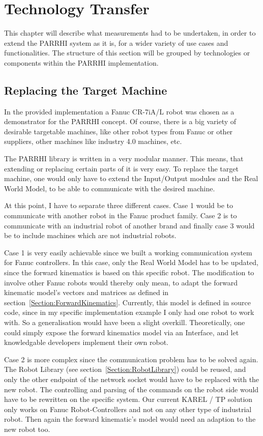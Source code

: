 \chapter{Technology Transfer}
\label{Chap:TechnologyTransfer}
\label{Section:TechnologyTransfer}

This chapter will describe what measurements had to be undertaken, in order to extend the PARRHI system as it is, for a wider variety of use cases and functionalities. The structure of this section will be grouped by technologies or components within the PARRHI implementation.

\section{Replacing the Target Machine}
In the provided implementation a Fanuc CR-7iA/L robot was chosen as a demonstrator for the PARRHI concept. Of course, there is a big variety of desirable targetable machines, like other robot types from Fanuc or other suppliers, other machines like industry 4.0 machines, etc.

The PARRHI library is written in a very modular manner. This means, that extending or replacing certain parts of it is very easy. To replace the target machine, one would only have to extend the Input/Output modules and the Real World Model, to be able to communicate with the desired machine.

At this point, I have to separate three different cases. Case 1 would be to communicate with another robot in the Fanuc product family. Case 2 is to communicate with an industrial robot of another brand and finally case 3 would be to include machines which are not industrial robots. 

Case 1 is very easily achievable since we built a working communication system for Fanuc controllers. In this case, only the Real World Model has to be updated, since the forward kinematics is based on this specific robot. The modification to involve other Fanuc robots would thereby only mean, to adapt the forward kinematic model's vectors and matrices as defined in section~\ref{Section:ForwardKinematics}. Currently, this model is defined in source code, since in my specific implementation example I only had one robot to work with. So a generalisation would have been a slight overkill. Theoretically, one could simply expose the forward kinematics model via an Interface, and let knowledgable developers implement their own robot. 

Case 2 is more complex since the communication problem has to be solved again. The Robot Library (see section~\ref{Section:RobotLibrary}) could be reused, and only the other endpoint of the network socket would have to be replaced with the new robot. The controlling and parsing of the commands on the robot side would have to be rewritten on the specific system. Our current KAREL / TP solution only works on Fanuc Robot-Controllers and not on any other type of industrial robot. Then again the forward kinematic's model would need an adaption to the new robot too.

